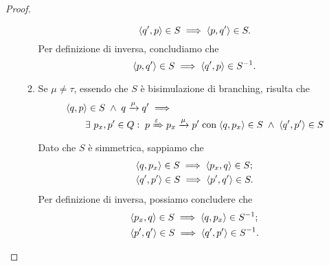 \begin{proof}
\begin{enumerate}[leftmargin=*]
\begin{enumerate}
\[	\langle q',p \rangle \in S \implies \langle p,q' \rangle \in S.
\]
Per definizione di inversa, concludiamo che \[
	\langle p,q' \rangle \in S \implies \langle q',p \rangle \in S^{-1}.
\]
\item Se $\mu \neq \tau$, essendo che $S$ è bisimulazione di branching, risulta che
\begin{align*}
	&\langle q,p \rangle \in S \; \land \; q \xrightarrow{\mu} q' \implies \\
	&\hspace{2em} \exists\ p_x, p' \in Q :\; p \xRightarrow{\varepsilon} p_x \xrightarrow{\mu} p' 
	 \; \text{con} \; \langle q, p_x \rangle \in S \; \land \; \langle q', p' \rangle \in S
\end{align*}
Dato che $S$ è simmetrica, sappiamo che
\begin{align*}
	&\langle q, p_x \rangle \in S \implies \langle p_x, q \rangle \in S; \\
	&\langle q', p' \rangle \in S \implies \langle p', q' \rangle \in S.
\end{align*}
Per definizione di inversa, possiamo concludere che
\begin{align*}
	&\langle p_x, q \rangle \in S  \implies \langle q, p_x \rangle \in S^{-1};\\
	&\langle p', q' \rangle \in S  \implies \langle q', p' \rangle \in S^{-1}.
\end{align*}
\end{enumerate}
\end{enumerate}
\end{proof}

